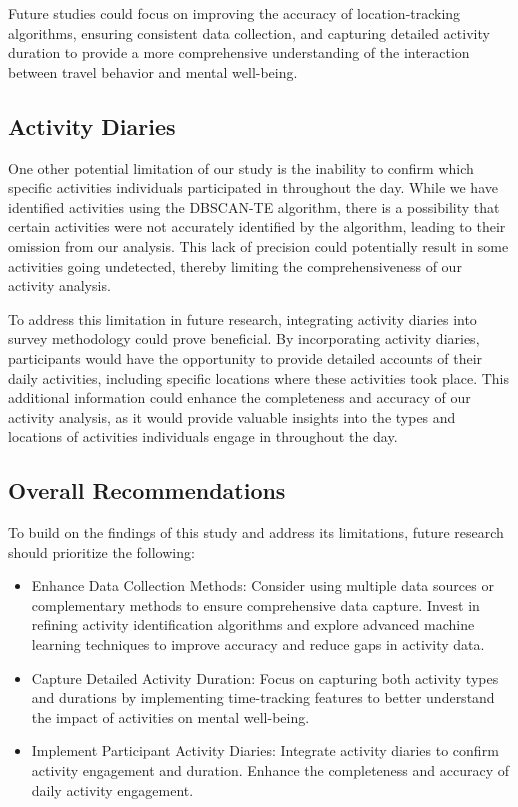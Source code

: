 \documentclass[
  letterpaper,
  number,
  review,
  3p]{elsarticle}
\begin{document}
Future studies could focus on improving the accuracy of
location-tracking algorithms, ensuring consistent data collection, and
capturing detailed activity duration to provide a more comprehensive
understanding of the interaction between travel behavior and mental
well-being.

\subsection{Activity Diaries}\label{activity-diaries}

One other potential limitation of our study is the inability to confirm
which specific activities individuals participated in throughout the
day. While we have identified activities using the DBSCAN-TE algorithm,
there is a possibility that certain activities were not accurately
identified by the algorithm, leading to their omission from our
analysis. This lack of precision could potentially result in some
activities going undetected, thereby limiting the comprehensiveness of
our activity analysis.

To address this limitation in future research, integrating activity
diaries into survey methodology could prove beneficial. By incorporating
activity diaries, participants would have the opportunity to provide
detailed accounts of their daily activities, including specific
locations where these activities took place. This additional information
could enhance the completeness and accuracy of our activity analysis, as
it would provide valuable insights into the types and locations of
activities individuals engage in throughout the day.

\subsection{Overall Recommendations}\label{overall-recommendations}

To build on the findings of this study and address its limitations,
future research should prioritize the following:

\begin{itemize}
\item
  Enhance Data Collection Methods: Consider using multiple data sources
  or complementary methods to ensure comprehensive data capture. Invest
  in refining activity identification algorithms and explore advanced
  machine learning techniques to improve accuracy and reduce gaps in
  activity data.
\item
  Capture Detailed Activity Duration: Focus on capturing both activity
  types and durations by implementing time-tracking features to better
  understand the impact of activities on mental well-being.
\item
  Implement Participant Activity Diaries: Integrate activity diaries to
  confirm activity engagement and duration. Enhance the completeness and
  accuracy of daily activity engagement.
\end{itemize}
\end{document}
